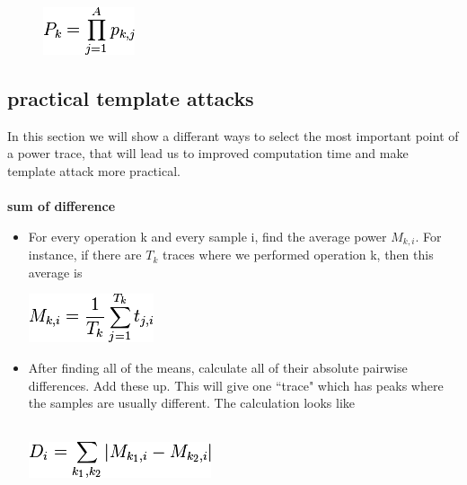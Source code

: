    \begin{figure}[htp]
        \centering
        \includegraphics{images/Lecture_5/pic8.png}
       \end{figure}
    
    \subsection{practical template attacks}
    In this section we will show a differant ways to select the most important point of a power trace, that will lead us to improved computation time and make template attack more practical.\\
    \\
    \textbf{sum of difference}
       \begin{itemize}
          \item For every operation k and every sample i, find the average power $M_{k, i}$. For instance, if there are $T_k$ traces where we performed operation k, then this average is\\
              \begin{minipage}{\linewidth}
              \centering
              \includegraphics{images/Lecture_5/pic9.png}
              \end{minipage}
           
          \item After finding all of the means, calculate all of their absolute pairwise differences. Add these up. This will give one ``trace" which has peaks where the samples are usually different. The calculation looks like\\
          \\
              \begin{minipage}{\linewidth}
              \centering
              \includegraphics{images/Lecture_5/pic10.png}
              \end{minipage}
       \end{itemize}
